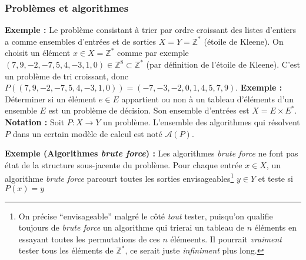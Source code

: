 \documentclass[../../../main.tex]{subfiles}
\begin{document}
\subsubsection{Problèmes et algorithmes}
\textbf{Exemple :} Le problème consistant à trier par ordre croissant des listes d'entiers a comme ensembles d'entrées et de sorties $X = Y = \mathbb{Z}^*$ (étoile de Kleene).\newline
On choisit un élément $x\in X = \mathbb{Z}^*$ comme par exemple $(7, 9, -2, -7, 5, 4, -3, 1, 0)\in\mathbb{Z}^8\subset{\mathbb{Z}^*}$ (par définition de l'étoile de Kleene).\newline
C'est un problème de tri croissant, donc $P((7, 9, -2, -7, 5, 4, -3, 1, 0)) = (-7, -3, -2, 0, 1, 4, 5, 7, 9)$.
\textbf{Exemple :} Déterminer si un élément $e\in E$ appartient ou non à un tableau d'éléments d'un ensemble $E$ est un problème de décision. Son ensemble d'entrées est $X = E\times E^*$.
\textbf{Notation :} Soit $P:X\rightarrow Y$ un problème. L'ensemble des algorithmes qui résolvent $P$ dans un certain modèle de calcul est noté $\mathcal{A}(P)$.

\textbf{Exemple (Algorithmes \textit{brute force}) :} Les algorithmes \textit{brute force} ne font pas état de la structure sous-jacente du problème. Pour chaque entrée $x\in X$, un algorithme \textit{brute force} parcourt toutes les sorties envisageables\footnote{On précise ``envisageable'' malgré le côté \textit{tout} tester, puisqu'on qualifie toujours de \textit{brute force} un algorithme qui trierai un tableau de $n$ éléments en essayant toutes les permutations de ces $n$ élémeents. Il pourrait \textit{vraiment} tester tous les éléments de $\mathbb{Z}^*$, ce serait juste \textit{infiniment} plus long.} $y\in Y$ et teste si $P(x) = y$
\end{document}
